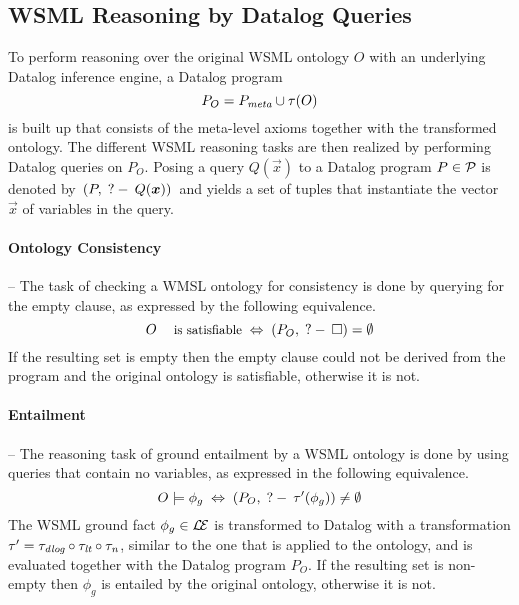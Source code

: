 \subsection{WSML Reasoning by Datalog Queries}

To perform reasoning over the original WSML ontology $O$ with an
underlying Datalog inference engine, a Datalog program \compress
\begin{displaymath}
    P_O = \mlaxioms \cup \tau(O) \compress
\end{displaymath}
is built up that consists of the meta-level axioms together with
the transformed ontology. The different WSML reasoning tasks are
then realized by performing Datalog queries on $P_O$. Posing a
query $Q(\vec{x})$ to a Datalog program $P \in \P$ is denoted by
$\,(P,\qury Q(\vec{x}))\,$ and yields a set of tuples that
instantiate the vector $\vec{x}$ of variables in the query.

\paragraph{Ontology Consistency} -- The task of checking a WMSL
ontology for consistency is done by querying for the empty clause,
as expressed by the following equivalence. \compress
\begin{displaymath}
    O \; \textrm{\footnotesize{is satisfiable}} \; \Leftrightarrow \; (P_O , \qury \square) =
    \emptyset \compress
\end{displaymath}
If the resulting set is empty then the empty clause could not be
derived from the program and the original ontology is satisfiable,
otherwise it is not.

\paragraph{Entailment} -- The reasoning task of ground entailment by a WSML ontology is done by using queries that
contain no variables, as expressed in the following equivalence.
\compress
\begin{displaymath}
    O \models \phi_g \; \Leftrightarrow \; (P_O, \qury
    \tau'(\phi_g)) \not= \emptyset \compress
\end{displaymath}
The WSML ground fact $\phi_g \in \LE$ is transformed to Datalog
with a transformation $\tau' = \transdlog \circ \translt \circ
\transnorm$, similar to the one that is applied to the ontology,
and is evaluated together with the Datalog program $P_O$. If the
resulting set is non-empty then $\phi_g$ is entailed by the
original ontology, otherwise it is not.

